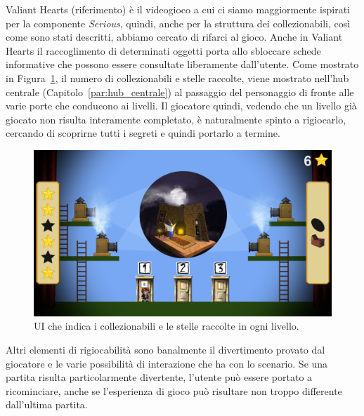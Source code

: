 Valiant Hearts (riferimento) è il videogioco a cui ci siamo maggiormente ispirati per la componente \textit{Serious}, quindi, anche per la struttura dei collezionabili, così come sono stati descritti, abbiamo cercato di rifarci al gioco. Anche in Valiant Hearts il raccoglimento di determinati oggetti porta allo sbloccare schede informative che possono essere consultate liberamente dall’utente.
Come mostrato in Figura~\ref{fig:rigiocabilita_UI_hub}, il numero di collezionabili e stelle raccolte, viene mostrato nell’hub centrale (Capitolo~\ref{par:hub_centrale}) al passaggio del personaggio di fronte alle varie porte che conducono ai livelli. Il giocatore quindi, vedendo che un livello già giocato non risulta interamente completato, è naturalmente spinto a rigiocarlo, cercando di scoprirne tutti i segreti e quindi portarlo a termine.

\begin{figure}%
	\centering
	\includegraphics[width= 0.9\columnwidth]{images/gameDesign/26_hub.jpg}
	\caption{UI che indica i collezionabili e le stelle raccolte in ogni livello.}
	\label{fig:rigiocabilita_UI_hub}
\end{figure} 

Altri elementi di rigiocabilità sono banalmente il divertimento provato dal giocatore e le varie possibilità di interazione che ha con lo scenario.
Se una partita risulta particolarmente divertente, l’utente può essere portato a ricominciare, anche se l’esperienza di gioco può risultare non troppo differente dall’ultima partita.

